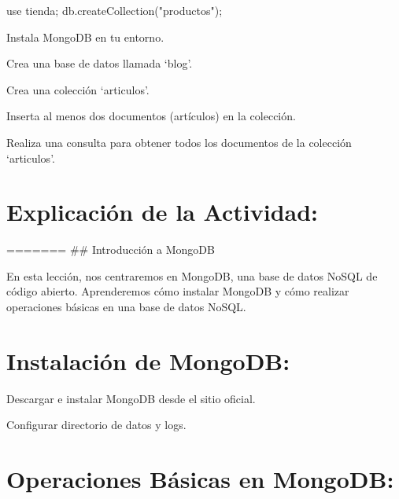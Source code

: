 \documentclass[
  a4paper,
  DIV=11,
  numbers=noendperiod,
  onepage,
  openany]{scrreprt}
\newenvironment{Shaded}{\begin{snugshade}}{\end{snugshade}}
\newcommand{\NormalTok}[1]{\textcolor[rgb]{0.00,0.23,0.31}{#1}}
\begin{document}
\begin{Shaded}
\begin{Highlighting}[]
\NormalTok{use tienda;}
\NormalTok{db.createCollection("productos");}
\end{Highlighting}
\end{Shaded}

\begin{tcolorbox}[enhanced jigsaw, colbacktitle=quarto-callout-important-color!10!white, toprule=.15mm, leftrule=.75mm, titlerule=0mm, opacityback=0, rightrule=.15mm, opacitybacktitle=0.6, breakable, left=2mm, coltitle=black, title=\textcolor{quarto-callout-important-color}{\faExclamation}\hspace{0.5em}{Actividad Práctica:}, toptitle=1mm, bottomtitle=1mm, arc=.35mm, bottomrule=.15mm, colback=white, colframe=quarto-callout-important-color-frame]

Instala MongoDB en tu entorno.

Crea una base de datos llamada `blog'.

Crea una colección `articulos'.

Inserta al menos dos documentos (artículos) en la colección.

Realiza una consulta para obtener todos los documentos de la colección
`articulos'.

\end{tcolorbox}

\hypertarget{explicaciuxf3n-de-la-actividad-68}{%
\section{Explicación de la
Actividad:}\label{explicaciuxf3n-de-la-actividad-68}}

======= \#\# Introducción a MongoDB

En esta lección, nos centraremos en MongoDB, una base de datos NoSQL de
código abierto. Aprenderemos cómo instalar MongoDB y cómo realizar
operaciones básicas en una base de datos NoSQL.

\hypertarget{instalaciuxf3n-de-mongodb-1}{%
\section{Instalación de MongoDB:}\label{instalaciuxf3n-de-mongodb-1}}

Descargar e instalar MongoDB desde el sitio oficial.

Configurar directorio de datos y logs.

\hypertarget{operaciones-buxe1sicas-en-mongodb-1}{%
\section{Operaciones Básicas en
MongoDB:}\label{operaciones-buxe1sicas-en-mongodb-1}}
\end{document}
